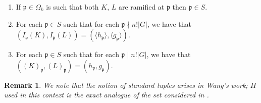 \documentclass[11pt]{amsart}
\newtheorem{remark}[theorem]{Remark}
\newcommand{\fp}{\mathfrak{p}}
\numberwithin{equation}{section}
\begin{document}
\begin{enumerate}
    \item  If $\fp \in \Omega_k$ is such that both $K$, $L$ are ramified at $\fp$ then $\fp \in S$.
    \item For each $\fp \in S$ such that for each $\fp \nmid n!|G|$, we have that $(I_{\fp}(K), I_{\fp}(L)) = (\langle h_{\fp}\rangle,\langle g_{\fp}\rangle)$.
    \item For each $\fp \in S$ such that for each $\fp \mid n!|G|$, we have that $((K)_{\fp}, (L)_{\fp})= (h_{\fp}, g_{\fp})$.
\end{enumerate}
\begin{remark}
    We note that the notion of standard tuples arises in Wang's work; $\Pi$ used in this context is the exact analogue of the set considered in \cite[equation (5.10)]{Wang2020}. 
\end{remark}
\end{document}
